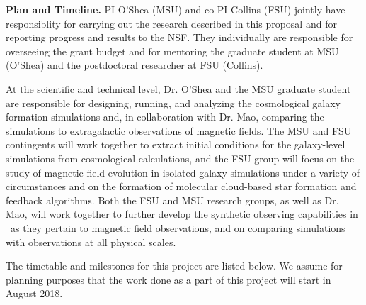\vspace{2mm}
\noindent
\textbf{Plan and Timeline.}
PI O'Shea (MSU) and co-PI Collins (FSU) jointly have responsiblity for
carrying out the research described in this proposal and for reporting
progress and results to the NSF.  They individually are responsible
for overseeing the grant budget and for mentoring the graduate student
at MSU (O'Shea) and the postdoctoral researcher at FSU (Collins).

At the scientific and technical level, Dr. O'Shea and the MSU graduate
student are responsible for designing, running, and analyzing the
cosmological galaxy formation simulations and, in collaboration with
Dr. Mao, comparing the simulations to extragalactic observations of
magnetic fields.  The MSU and FSU contingents will work together to
extract initial conditions for the galaxy-level simulations from
cosmological calculations, and the FSU group will focus on the
study of magnetic field evolution in isolated galaxy simulations under
a variety of circumstances and on the formation of molecular
cloud-based star formation and feedback algorithms.  Both the FSU and
MSU research groups, as well as Dr. Mao, will work together to further
develop the synthetic observing capabilities in \yt\ as they pertain
to magnetic field observations, and on comparing simulations with
observations at all physical scales.

The timetable and milestones for this project are listed below.  We
assume for planning purposes that the work done as a part of this
project will start in August 2018.

\vspace{-2mm}

